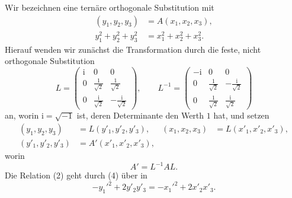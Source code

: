 \documentclass[11pt]{article}
\providecommand{\ii}{\mathrm{i}}
\begin{document}
Wir bezeichnen eine ternäre orthogonale Substitution mit
\begin{align}
(y_1,y_2,y_3)&=A(x_1,x_2,x_3),\tag{1}\\
y_1^2+y_2^2+y_3^2&=x_1^2+x_2^2+x_3^2.\tag{2}
\end{align}
Hierauf wenden wir zunächst die Transformation durch die feste, nicht orthogonale Substitution
\begin{equation}
L=\begin{pmatrix}
\ii&0&0\\
0&\frac1{\sqrt2}&\frac1{\sqrt2}\\
0&\frac{\ii}{\sqrt2}&-\frac{\ii}{\sqrt2}
\end{pmatrix},\qquad
L^{-1}=\begin{pmatrix}
-\ii&0&0\\
0&\frac1{\sqrt2}&-\frac{\ii}{\sqrt2}\\
0&\frac1{\sqrt2}&\frac{\ii}{\sqrt2}
\end{pmatrix}
\tag{3}
\end{equation}
an, worin $\ii=\sqrt{-1}$ ist, deren Determinante den Werth $1$ hat, und setzen
\begin{align}
(y_1,y_2,y_3)&=L(y'_1,y'_2,y'_3),&(x_1,x_2,x_3)&=L(x'_1,x'_2,x'_3),\tag{4}\\
(y'_1,y'_2,y'_3)&=A'(x'_1,x'_2,x'_3),\tag{5}
\end{align}
worin
\begin{equation}
A'=L^{-1}AL.
\tag{6}
\end{equation}
Die Relation (2) geht durch (4) über in
\begin{equation}
-y_1'^2+2y'_2y'_3=-x_1'^2+2x'_2x'_3.
\tag{7}
\end{equation}
\end{document}
